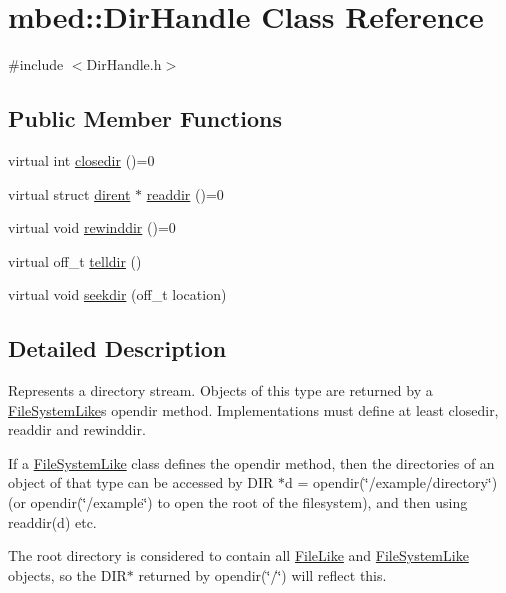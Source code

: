 \hypertarget{classmbed_1_1DirHandle}{}\section{mbed\+:\+:Dir\+Handle Class Reference}
\label{classmbed_1_1DirHandle}


{\ttfamily \#include $<$Dir\+Handle.\+h$>$}

\subsection*{Public Member Functions}
\begin{DoxyCompactItemize}
\item 
virtual int \hyperlink{classmbed_1_1DirHandle_a4c26b9d7fc438b1f7d9b01ced8629f6e}{closedir} ()=0
\item 
virtual struct \hyperlink{structdirent}{dirent} $\ast$ \hyperlink{classmbed_1_1DirHandle_a5d90793d31cb04ccc3105922a68b147f}{readdir} ()=0
\item 
virtual void \hyperlink{classmbed_1_1DirHandle_af21ed332757da752a1286e1a0189957a}{rewinddir} ()=0
\item 
virtual off\+\_\+t \hyperlink{classmbed_1_1DirHandle_a6b509a9d24905b38e3883e998de13ae1}{telldir} ()
\item 
virtual void \hyperlink{classmbed_1_1DirHandle_a5f4511c471648633570515cc9ff9e9e5}{seekdir} (off\+\_\+t location)
\end{DoxyCompactItemize}


\subsection{Detailed Description}
Represents a directory stream. Objects of this type are returned by a \hyperlink{classmbed_1_1FileSystemLike}{File\+System\+Like}\textquotesingle{}s opendir method. Implementations must define at least closedir, readdir and rewinddir.

If a \hyperlink{classmbed_1_1FileSystemLike}{File\+System\+Like} class defines the opendir method, then the directories of an object of that type can be accessed by D\+IR $\ast$d = opendir(\char`\"{}/example/directory\char`\"{}) (or opendir(\char`\"{}/example\char`\"{}) to open the root of the filesystem), and then using readdir(d) etc.

The root directory is considered to contain all \hyperlink{classmbed_1_1FileLike}{File\+Like} and \hyperlink{classmbed_1_1FileSystemLike}{File\+System\+Like} objects, so the D\+I\+R$\ast$ returned by opendir(\char`\"{}/\char`\"{}) will reflect this. 


